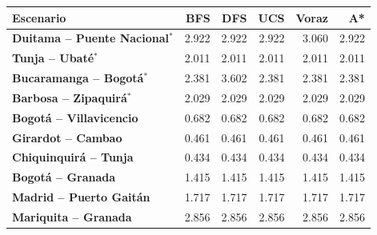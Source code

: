\renewcommand{\arraystretch}{1.2}
\begin{tabular}{|l|r|r|r|r|r|}
\hline
\rowcolor{gray!20} \textbf{Escenario} & \textbf{BFS} & \textbf{DFS} & \textbf{UCS} & \textbf{Voraz} & \textbf{A*} \\
\hline
\textbf{Duitama -- Puente Nacional$^{*}$} & 2.922 & 2.922 & 2.922 & 3.060 & 2.922 \\
\hline
\textbf{Tunja -- Ubaté$^{*}$} & 2.011 & 2.011 & 2.011 & 2.011 & 2.011 \\
\hline
\textbf{Bucaramanga -- Bogotá$^{*}$} & 2.381 & 3.602 & 2.381 & 2.381 & 2.381 \\
\hline
\textbf{Barbosa -- Zipaquirá$^{*}$} & 2.029 & 2.029 & 2.029 & 2.029 & 2.029 \\
\hline
\textbf{Bogotá -- Villavicencio} & 0.682 & 0.682 & 0.682 & 0.682 & 0.682 \\
\hline
\textbf{Girardot -- Cambao} & 0.461 & 0.461 & 0.461 & 0.461 & 0.461 \\
\hline
\textbf{Chiquinquirá -- Tunja} & 0.434 & 0.434 & 0.434 & 0.434 & 0.434 \\
\hline
\textbf{Bogotá -- Granada} & 1.415 & 1.415 & 1.415 & 1.415 & 1.415 \\
\hline
\textbf{Madrid -- Puerto Gaitán} & 1.717 & 1.717 & 1.717 & 1.717 & 1.717 \\
\hline
\textbf{Mariquita -- Granada} & 2.856 & 2.856 & 2.856 & 2.856 & 2.856 \\
\hline
\end{tabular}
